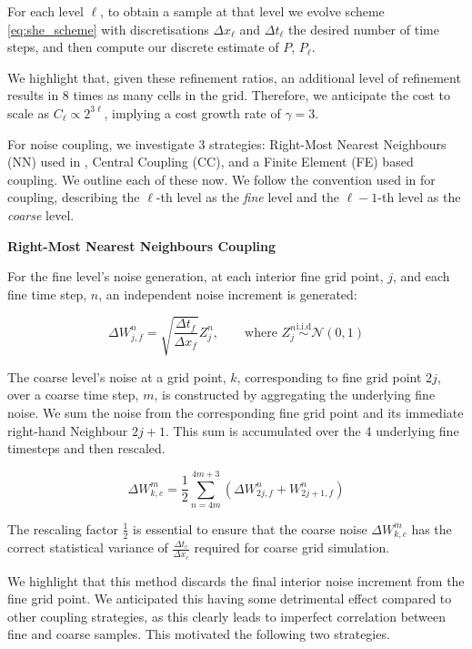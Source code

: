 For each level $\ell$, to obtain a sample at that level we evolve scheme \eqref{eq:she_scheme} 
with discretisations $\Delta x_\ell$ and $\Delta t_\ell$ the desired number of time steps, 
and then compute our discrete estimate of $P$, $P_\ell$. 

We highlight that, given these refinement ratios, an additional level 
of refinement results in 8 times as many cells in the grid. Therefore, 
we anticipate the cost to scale as $C_\ell \propto 2^{3\ell}$, implying a 
cost growth rate of $\gamma = 3$.

For noise coupling, we investigate 3 strategies: Right-Most Nearest Neighbours (NN)
used in \cite{cornalba2025multilevel}, Central Coupling (CC), and a Finite Element (FE)
based coupling. We outline each of these now. We follow the convention used in 
\cite{giles2015multilevel} for coupling, describing the $\ell$-th level as 
the \textit{fine} level and the $\ell - 1$-th level as the \textit{coarse} level.
\newline

\textbf{Right-Most Nearest Neighbours Coupling}

For the fine level's noise generation, at each interior fine grid point, $j$, and each fine 
time step, $n$, an independent noise increment is generated:

\begin{equation*}
    \Delta W_{j,f}^n = \sqrt{\frac{\Delta t_f}{\Delta x_f}} Z_j^n, \qquad \text{where } 
    Z_j^n \overset{\mathrm{i.i.d}}{\sim} \mathcal{N}(0,1)
\end{equation*}

The coarse level's noise at a grid point, $k$,
corresponding to fine grid point $2j$,
over a coarse time step, $m$, is constructed by 
aggregating the underlying fine noise. We sum 
the noise from the corresponding fine grid point
and its immediate right-hand Neighbour
$2j + 1$. This sum is accumulated over 
the 4 underlying fine timesteps 
and then rescaled.

\begin{equation*}
    \Delta W_{k,c}^m = \frac{1}{2} \sum_{n = 4m}^{4m+3}
    \left(\Delta W_{2j,f}^n + W_{2j+1, f}^n \right)
\end{equation*}

The rescaling factor $\frac{1}{2}$ is essential to 
ensure that the coarse noise $\Delta W_{k,c}^m$
has the correct statistical variance of 
$\frac{\Delta t_c}{\Delta x_c}$ required for 
coarse grid simulation.

We highlight that this method discards the final 
interior noise increment from the fine grid
point. We anticipated this having some 
detrimental effect compared to 
other coupling strategies, as 
this clearly leads to imperfect correlation
between fine and coarse samples.
This motivated the following two strategies.
\newline

